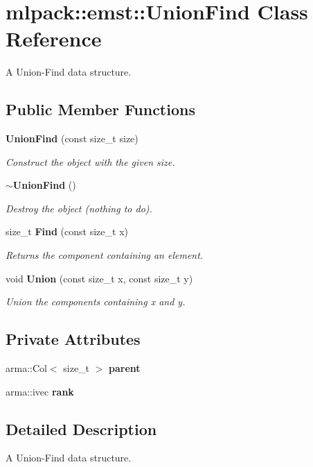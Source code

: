 \section{mlpack\+:\+:emst\+:\+:Union\+Find Class Reference}
\label{classmlpack_1_1emst_1_1UnionFind}


A Union-\/\+Find data structure.  


\subsection*{Public Member Functions}
\begin{DoxyCompactItemize}
\item 
{\bf Union\+Find} (const size\+\_\+t size)
\begin{DoxyCompactList}\small\item\em Construct the object with the given size. \end{DoxyCompactList}\item 
{\bf $\sim$\+Union\+Find} ()
\begin{DoxyCompactList}\small\item\em Destroy the object (nothing to do). \end{DoxyCompactList}\item 
size\+\_\+t {\bf Find} (const size\+\_\+t x)
\begin{DoxyCompactList}\small\item\em Returns the component containing an element. \end{DoxyCompactList}\item 
void {\bf Union} (const size\+\_\+t x, const size\+\_\+t y)
\begin{DoxyCompactList}\small\item\em Union the components containing x and y. \end{DoxyCompactList}\end{DoxyCompactItemize}
\subsection*{Private Attributes}
\begin{DoxyCompactItemize}
\item 
arma\+::\+Col$<$ size\+\_\+t $>$ {\bf parent}
\item 
arma\+::ivec {\bf rank}
\end{DoxyCompactItemize}


\subsection{Detailed Description}
A Union-\/\+Find data structure. 


